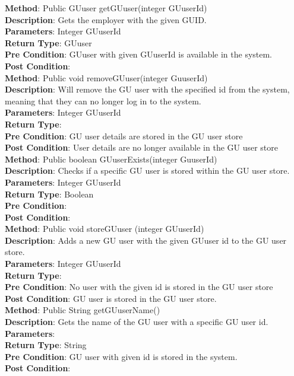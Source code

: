 \documentclass{l3deliverable}
\begin{document}
\textbf{Method}: Public GUuser getGUuser(integer GUuserId)\\
\textbf{Description}: Gets the employer with the given GUID.\\
\textbf{Parameters}: Integer GUuserId\\
\textbf{Return Type}: GUuser\\
\textbf{Pre Condition}: GUuser with given GUuserId is available in the system.\\
\textbf{Post Condition}:\\

\textbf{Method}: Public void removeGUuser(integer GuuserId)\\
\textbf{Description}: Will remove the GU user with the specified id from the system, meaning that they can no longer log in to the system.
\\
\textbf{Parameters}: Integer GUuserId\\
\textbf{Return Type}:\\
\textbf{Pre Condition}: GU user details are stored in the GU user store\\
\textbf{Post Condition}: User details are no longer available in the GU user store\\

\textbf{Method}: Public boolean GUuserExists(integer GuuserId)\\
\textbf{Description}: Checks if a specific GU user is stored within the GU user store.\\
\textbf{Parameters}: Integer GUuserId\\
\textbf{Return Type}: Boolean\\
\textbf{Pre Condition}:\\
\textbf{Post Condition}:\\

\textbf{Method}: Public void storeGUuser (integer GUuserId)\\
\textbf{Description}: Adds a new GU user with the given GUuser id to the GU user store.\\
\textbf{Parameters}: Integer GUuserId\\
\textbf{Return Type}:\\
\textbf{Pre Condition}: No user with the given id is stored in the GU user store\\
\textbf{Post Condition}: GU user is stored in the GU user store.\\

\textbf{Method}: Public String getGUuserName()\\
\textbf{Description}: Gets the name of the GU user with a specific GU user id.\\
\textbf{Parameters}:\\
\textbf{Return Type}: String\\
\textbf{Pre Condition}: GU user with given id is stored in the system.\\
\textbf{Post Condition}:\\
\end{document}
